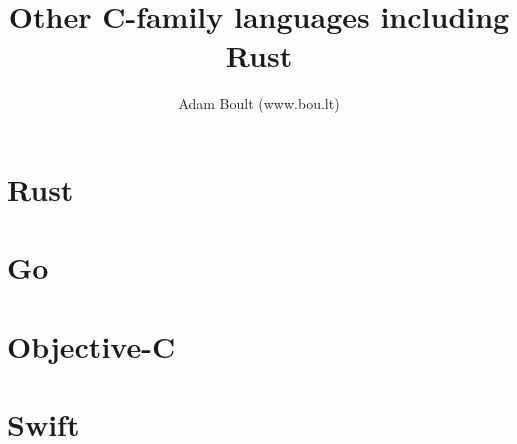 \documentclass[oneside]{book}
\begin{document}
\author{Adam Boult (www.bou.lt)}
\title{Other C-family languages including Rust}
\maketitle

\setcounter{tocdepth}{0}
\tableofcontents



\part{Rust}







\part{Go}

\part{Objective-C}

\part{Swift}
\end{document}
